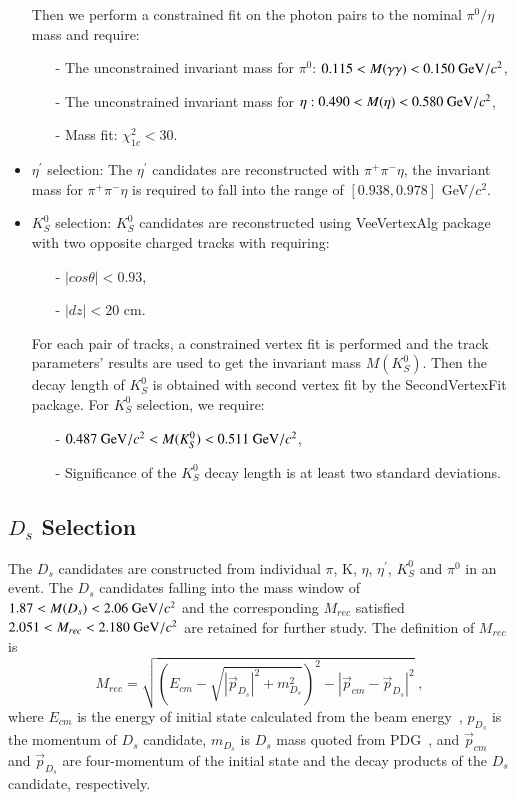\begin{itemize}
		Then we perform a constrained fit on the photon pairs to the nominal $\pi^{0}/\eta$ mass and require:
		\begin{itemize}
            \item[-] The unconstrained invariant mass for $\pi^{0}$: $0.115 < M(\gamma\gamma) < 0.150\ {\rm GeV}/c^{2}$,
            \item[-] The unconstrained invariant mass for $\eta: 0.490 < M(\eta) < 0.580\ {\rm GeV}/c^{2}$,
			\item[-] Mass fit: $\chi_{1c}^{2} < 30$.
		\end{itemize}
	\item $\eta^{'}$ selection: The $\eta^{'}$ candidates are reconstructed with $\pi^{+}\pi^{-}\eta$, the invariant mass for $\pi^{+}\pi^{-}\eta$ is required to fall into the range of $[0.938, 0.978]$ GeV$/c^{2}$.
	\item $K_{S}^{0}$ selection: $K_{S}^{0}$ candidates are reconstructed using VeeVertexAlg package with two opposite charged tracks with requiring:
		\begin{itemize}
			\item[-] $|cos\theta| < 0.93$,
			\item[-] $|dz| < 20$ cm.
		\end{itemize}

		For each pair of tracks, a constrained vertex fit is performed and the track parameters' results are used to get the invariant mass $M(K_{S}^{0})$. Then the decay length of $K_{S}^{0}$ is obtained with second vertex 
		fit by the SecondVertexFit package. For $K_{S}^{0}$ selection, we require:
		\begin{itemize}
            \item[-] ${\rm 0.487\ GeV}/c^{2} < M(K_S^{0}) < 0.511\ {\rm GeV}/c^{2}$,
			\item[-] Significance of the $K_{S}^{0}$ decay length is at least two standard deviations.
		\end{itemize}

\end{itemize}
\subsection{$D_{s}$ Selection}
The $D_{s}$ candidates are constructed from individual $\pi$, K, $\eta$, $\eta^{'}$, $K_{S}^{0}$ and $\pi^{0}$ in an event.
The $D_{s}$ candidates falling into the mass window of $1.87 < M(D_{s}) < 2.06\ {\rm GeV}/c^{2}$ and 
the corresponding $M_{rec}$ satisfied $2.051 < M_{rec} < 2.180\ {\rm GeV}/c^{2}$ are retained for further study. The definition of $M_{rec}$ is
\begin{equation}
    M_{rec} = \sqrt{(E_{cm} - \sqrt{|\vec p_{D_{s}} |^{2} + m_{D_{s}}^{2}})^{2} - |\vec p_{cm} - \vec p_{D_{s}} | ^{2}} \; , \label{con:inventoryflow}
\end{equation}
where $E_{cm}$ is the energy of initial state calculated from the beam energy~\cite{DocDB 580-v1}, $p_{D_{s}}$ is the momentum of $D_{s}$ candidate, $m_{D_{s}}$ is $D_{s}$ mass quoted from PDG~\cite{PDG2018}, and $\vec p_{cm}$ and $\vec p_{D_{s}}$ are four-momentum of the initial state and the decay products of the $D_{s}$ candidate, respectively.

